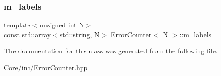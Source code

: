 \mbox{\label{class_error_counter_ac2f34a61c4c38ece96df182dd4b5c5ca}} 
\subsubsection{\texorpdfstring{m\+\_\+labels}{m\_labels}}
{\footnotesize\ttfamily template$<$unsigned int N$>$ \\
const std\+::array$<$std\+::string, N$>$ \hyperlink{class_error_counter}{Error\+Counter}$<$ N $>$\+::m\+\_\+labels\hspace{0.3cm}{\ttfamily [private]}}



The documentation for this class was generated from the following file\+:\begin{DoxyCompactItemize}
\item 
Core/inc/\hyperlink{_error_counter_8hpp}{Error\+Counter.\+hpp}\end{DoxyCompactItemize}
